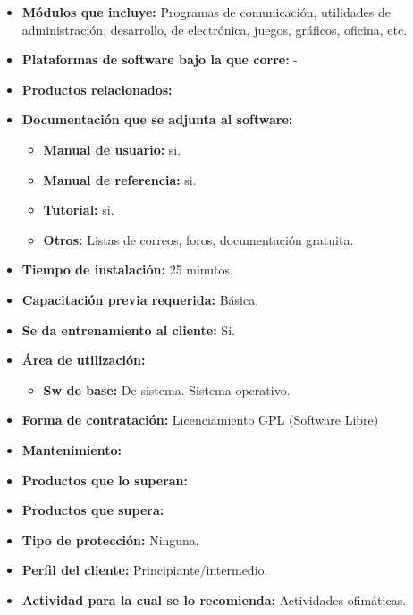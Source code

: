 \begin{itemize}
  \item \textbf{Módulos que incluye:} Programas de comunicación, utilidades de administración, desarrollo, de electrónica, juegos, gráficos, oficina, etc.
  \item \textbf{Plataformas de software bajo la que corre:} -
  \item \textbf{Productos relacionados:} 

  \item \textbf{Documentación que se adjunta al software:}
    \begin{itemize}
      \item \textbf{Manual de usuario:} si.
      \item \textbf{Manual de referencia:} si.
      \item \textbf{Tutorial:} si.
      \item \textbf{Otros:} Listas de correos, foros, documentación gratuita.
    \end{itemize}

  \item \textbf{Tiempo de instalación:} 25 minutos.
  \item \textbf{Capacitación previa requerida:} Básica.
  \item \textbf{Se da entrenamiento al cliente:} Si.

  \item \textbf{Área de utilización:}
    \begin{itemize}
      \item \textbf{Sw de base:} De sistema. Sistema operativo.
    \end{itemize}

  \item \textbf{Forma de contratación:} Licenciamiento GPL (Software Libre)
  \item \textbf{Mantenimiento:} 
  \item \textbf{Productos que lo superan:} 
  \item \textbf{Productos que supera:} 
  \item \textbf{Tipo de protección:} Ninguna.
  \item \textbf{Perfil del cliente:} Principiante/intermedio.
  \item \textbf{Actividad para la cual se lo recomienda:} Actividades ofimáticas.
\end{itemize}

